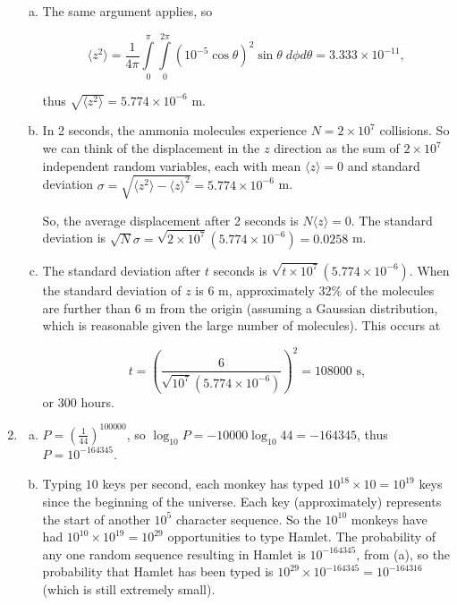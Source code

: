 \documentclass{article}
\begin{document}
\begin{enumerate}
\begin{enumerate}[(a)]
	\item

	The same argument applies, so

	$$\langle z^2 \rangle =  \frac{1}{4\pi} \int\limits_0^\pi \int \limits_0^{2\pi} (10^{-5} \cos\theta)^2 \sin\theta \; d\phi d\theta = 3.333 \times 10^{-11},$$

	thus $\sqrt{\langle z^2 \rangle} = 5.774 \times 10^{-6}$ m.

	\item 

	In 2 seconds, the ammonia molecules experience $N = 2 \times 10^7$ collisions. So we can think of the displacement in the $z$ direction as the sum of $2 \times 10^7$ independent random variables, each with mean $\langle z \rangle = 0$ and standard deviation $\sigma = \sqrt{\langle z^2 \rangle - \langle z \rangle ^2} = 5.774 \times 10^{-6}$ m.

	So, the average displacement after 2 seconds is $N \langle z \rangle = 0$. The standard deviation is $\sqrt{N}\sigma= \sqrt{2 \times 10^7} (5.774 \times 10^{-6}) = 0.0258$ m.

	\item

	The standard deviation after $t$ seconds is $\sqrt{t \times 10^7} (5.774 \times 10^{-6})$. When the standard deviation of $z$ is 6 m, approximately 32\% of the molecules are further than 6 m from the origin (assuming a Gaussian distribution, which is reasonable given the large number of molecules). This occurs at 

	$$t = \left( \frac{6}{\sqrt{10^7} (5.774 \times 10^{-6})} \right)^2 = 108000 \text{ s,}$$ or 300 hours.

	\end{enumerate}

\item

	\begin{enumerate}[(a)]

	\item

	$P = \left( \frac{1}{44} \right)^{100000}$, so $\log_{10}{P} = -10000\log_{10}44 = -164345$, thus $P = 10^{-164345}$.

	\item

	Typing $10$ keys per second, each monkey has typed $10^{18} \times 10 = 10^{19}$ keys since the beginning of the universe. Each key (approximately) represents the start of another $10^5$ character sequence. So the $10^{10}$ monkeys have had $10^{10} \times 10^{19} = 10^{29}$ opportunities to type Hamlet. The probability of any one random sequence resulting in Hamlet is $10^{-164345}$, from (a), so the probability that Hamlet has been typed is $10^{29} \times 10^{-164345} = 10^{-164316}$ (which is still extremely small).

	\end{enumerate}

\end{enumerate}
\end{document}
